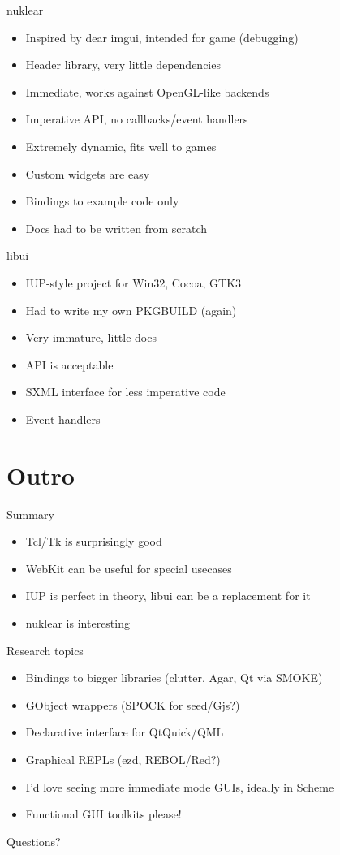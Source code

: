 \documentclass[presentation]{beamer}
\begin{document}
\begin{frame}[label=sec-4-2]{nuklear}
\begin{itemize}
\item Inspired by dear imgui, intended for game (debugging)
\item Header library, very little dependencies
\item Immediate, works against OpenGL-like backends
\item Imperative API, no callbacks/event handlers
\item Extremely dynamic, fits well to games
\item Custom widgets are easy
\item Bindings to example code only
\item Docs had to be written from scratch
\end{itemize}
\end{frame}

\begin{frame}[label=sec-4-3]{libui}
\begin{itemize}
\item IUP-style project for Win32, Cocoa, GTK3
\item Had to write my own PKGBUILD (again)
\item Very immature, little docs
\item API is acceptable
\item SXML interface for less imperative code
\item Event handlers
\end{itemize}
\end{frame}

\section{Outro}
\label{sec-5}

\begin{frame}[label=sec-5-1]{Summary}
\begin{itemize}
\item Tcl/Tk is surprisingly good
\item WebKit can be useful for special usecases
\item IUP is perfect in theory, libui can be a replacement for it
\item nuklear is interesting
\end{itemize}
\end{frame}

\begin{frame}[label=sec-5-2]{Research topics}
\begin{itemize}
\item Bindings to bigger libraries (clutter, Agar, Qt via SMOKE)
\item GObject wrappers (SPOCK for seed/Gjs?)
\item Declarative interface for QtQuick/QML
\item Graphical REPLs (ezd, REBOL/Red?)
\item I'd love seeing more immediate mode GUIs, ideally in Scheme
\item Functional GUI toolkits please!
\end{itemize}
\end{frame}

\begin{frame}[label=sec-5-3]{Questions?}
\end{frame}
\end{document}
